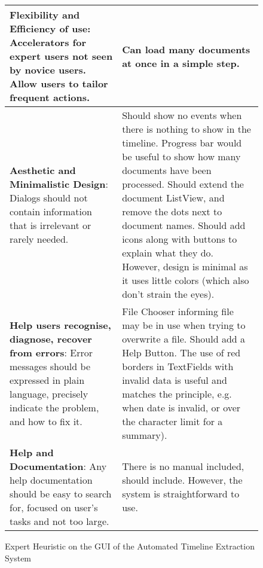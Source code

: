 \begin{figure}[h]
\begin{tabular}{|p{6cm}|p{8cm}|}
\hline
\textbf{Flexibility and Efficiency of use}: Accelerators for expert users not seen by novice users. Allow users to tailor frequent actions. & Can load many documents at once in a simple step.\\
\hline
\textbf{Aesthetic and Minimalistic Design}: Dialogs should not contain information that is irrelevant or rarely needed. & Should show no events when there is nothing to show in the timeline. Progress bar would be useful to show how many documents have been processed. Should extend the document ListView, and remove the dots next to document names. Should add icons along with buttons to explain what they do. However, design is minimal as it uses little colors (which also don't strain the eyes).\\
\hline
\textbf{Help users recognise, diagnose, recover from errors}: Error messages should be expressed in plain language, precisely indicate the problem, and how to fix it. & File Chooser informing file may be in use when trying to overwrite a file. Should add a Help Button. The use of red borders in TextFields with invalid data is useful and matches the principle, e.g. when date is invalid, or over the character limit for a summary).\\
\hline
\textbf{Help and Documentation}: Any help documentation should be easy to search for, focused on user’s tasks and not too large. & There is no manual included, should include. However, the system is straightforward to use.\\
\hline
\end{tabular}
\caption{Expert Heuristic on the GUI of the Automated Timeline Extraction System}
\label{fig:expertHer}
\end{figure}


